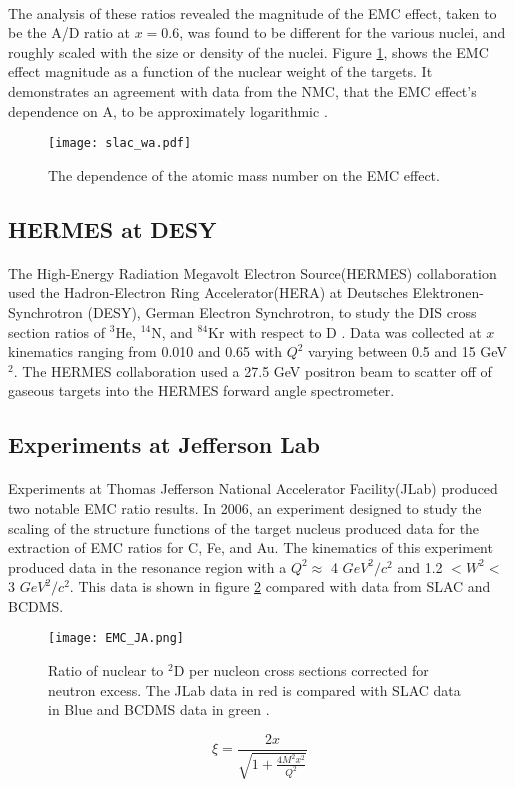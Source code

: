 \paragraph{} The analysis of these ratios revealed the magnitude of the EMC effect, taken to be the A/D ratio at $x=0.6$, was found to be different for the various nuclei, and roughly scaled with the size or density of the nuclei. Figure \ref{gomez_wa}, shows the EMC effect magnitude as a function of the nuclear weight of the targets. It demonstrates an agreement with data from the NMC, that the EMC effect's dependence on A, to be approximately logarithmic \cite{Ajth,gomez,seelyth}. 
\begin{figure}[h]
	\centering
	\texttt{[image: slac\_wa.pdf]} 
	\caption{The dependence of the atomic mass number on the EMC effect\cite{gomez}.}
	\label{gomez_wa}
\end{figure} 
\subsection{HERMES at DESY}
\paragraph{}
The High-Energy Radiation Megavolt Electron Source(HERMES) collaboration used the Hadron-Electron Ring Accelerator(HERA) at Deutsches Elektronen-Synchrotron (DESY), German Electron Synchrotron, to study the DIS cross section ratios of $^3$He, $^{14}$N, and $^{84}$Kr with respect to D \cite{HERMES_EMC}. Data was collected at $x$ kinematics ranging from 0.010 and 0.65 with $Q^2$ varying between 0.5 and 15 GeV$^2$\cite{HERMES_EMC}. The HERMES collaboration used a 27.5 GeV positron beam to scatter off of gaseous targets into the HERMES forward angle spectrometer. 
\subsection{Experiments at Jefferson Lab}
\paragraph{}Experiments at Thomas Jefferson National Accelerator Facility(JLab) produced two notable EMC ratio results. In 2006, an experiment designed to study the scaling of the structure functions of the target nucleus produced data for the extraction of EMC ratios for C, Fe, and Au. The kinematics of this experiment produced data in the resonance region with a $Q^2 \approx$ 4 $GeV^2/c^2$ and 1.2 $ < W^2 < $ 3 $GeV^2/c^2$. This data is shown in figure \ref{fig:EMCJA} compared with data from SLAC and BCDMS. 
\begin{figure}[t!]
	\centering
	\texttt{[image: EMC\_JA.png]} 
	\caption{Ratio of nuclear to $^2$D per nucleon cross sections corrected for neutron excess\cite{EMC_JA}. The JLab data in red is compared with SLAC data in Blue \cite{gomez} and BCDMS data in green \cite{BCDMS}.}
	\label{fig:EMCJA}
\end{figure} 
\begin{equation}
\xi = \frac{2x}{\sqrt{1 + \frac{4M^2x^2}{Q^2}}} \label{xi}
\end{equation}

